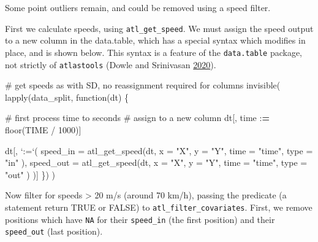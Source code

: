 \documentclass[]{scrreprt}
\newenvironment{Shaded}{}{}
\newcommand{\CommentTok}[1]{\textcolor[rgb]{0.00,0.50,0.00}{#1}}
\newcommand{\ControlFlowTok}[1]{\textcolor[rgb]{0.00,0.00,1.00}{#1}}
\newcommand{\DataTypeTok}[1]{#1}
\newcommand{\DecValTok}[1]{#1}
\newcommand{\ErrorTok}[1]{\textcolor[rgb]{1.00,0.00,0.00}{\textbf{#1}}}
\newcommand{\KeywordTok}[1]{\textcolor[rgb]{0.00,0.00,1.00}{#1}}
\newcommand{\NormalTok}[1]{#1}
\newcommand{\OperatorTok}[1]{#1}
\newcommand{\StringTok}[1]{\textcolor[rgb]{0.00,0.50,0.50}{#1}}
\begin{document}
Some point outliers remain, and could be removed using a speed filter.

First we calculate speeds, using \texttt{atl\_get\_speed}. We must assign the speed output to a new column in the data.table, which has a special syntax which modifies in place, and is shown below. This syntax is a feature of the \texttt{data.table} package, not strictly of \texttt{atlastools} (Dowle and Srinivasan \protect\hyperlink{ref-dowle2020}{2020}).

\begin{Shaded}
\begin{Highlighting}[]
\CommentTok{# get speeds as with SD, no reassignment required for columns}
\KeywordTok{invisible}\NormalTok{(}
  \KeywordTok{lapply}\NormalTok{(data_split, }\ControlFlowTok{function}\NormalTok{(dt) \{}

    \CommentTok{# first process time to seconds}
    \CommentTok{# assign to a new column}
\NormalTok{    dt[, time }\OperatorTok{:}\ErrorTok{=}\StringTok{ }\KeywordTok{floor}\NormalTok{(TIME }\OperatorTok{/}\StringTok{ }\DecValTok{1000}\NormalTok{)]}

\NormalTok{    dt[, }\StringTok{`}\DataTypeTok{:=}\StringTok{`}\NormalTok{(}
      \DataTypeTok{speed_in =} \KeywordTok{atl_get_speed}\NormalTok{(dt,}
        \DataTypeTok{x =} \StringTok{"X"}\NormalTok{, }\DataTypeTok{y =} \StringTok{"Y"}\NormalTok{,}
        \DataTypeTok{time =} \StringTok{"time"}\NormalTok{,}
        \DataTypeTok{type =} \StringTok{"in"}
\NormalTok{      ),}
      \DataTypeTok{speed_out =} \KeywordTok{atl_get_speed}\NormalTok{(dt,}
        \DataTypeTok{x =} \StringTok{"X"}\NormalTok{, }\DataTypeTok{y =} \StringTok{"Y"}\NormalTok{,}
        \DataTypeTok{time =} \StringTok{"time"}\NormalTok{,}
        \DataTypeTok{type =} \StringTok{"out"}
\NormalTok{      )}
\NormalTok{    )]}
\NormalTok{  \})}
\NormalTok{)}
\end{Highlighting}
\end{Shaded}

Now filter for speeds \textgreater{} 20 m/s (around 70 km/h), passing the predicate (a statement return TRUE or FALSE) to \texttt{atl\_filter\_covariates}. First, we remove positions which have \texttt{NA} for their \texttt{speed\_in} (the first position) and their \texttt{speed\_out} (last position).
\end{document}
